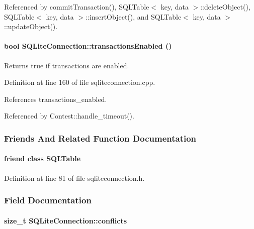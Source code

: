 Referenced by commit\-Transaction(), SQLTable$<$ key, data $>$::delete\-Object(), SQLTable$<$ key, data $>$::insert\-Object(), and SQLTable$<$ key, data $>$::update\-Object().\hypertarget{classSQLiteConnection_SQLiteConnectiona10}{
\paragraph[transactionsEnabled]{\setlength{\rightskip}{0pt plus 5cm}bool SQLite\-Connection::transactions\-Enabled ()}\hfill}
\label{classSQLiteConnection_SQLiteConnectiona10}


Returns true if transactions are enabled. 

Definition at line 160 of file sqliteconnection.cpp.

References transactions\_\-enabled.

Referenced by Contest::handle\_\-timeout().

\subsubsection{Friends And Related Function Documentation}
\hypertarget{classSQLiteConnection_SQLiteConnectionl0}{
\paragraph[SQLTable]{\setlength{\rightskip}{0pt plus 5cm}friend class SQLTable}\hfill}
\label{classSQLiteConnection_SQLiteConnectionl0}




Definition at line 81 of file sqliteconnection.h.

\subsubsection{Field Documentation}
\hypertarget{classSQLiteConnection_SQLiteConnectiono6}{
\paragraph[conflicts]{\setlength{\rightskip}{0pt plus 5cm}size\_\-t SQLite\-Connection::conflicts}\hfill}
\label{classSQLiteConnection_SQLiteConnectiono6}




